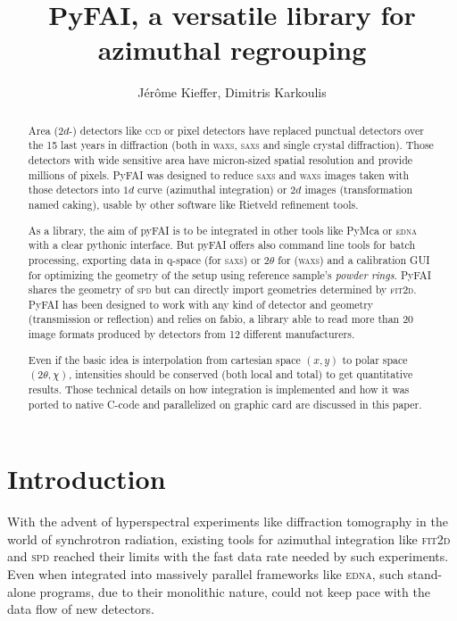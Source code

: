 \documentclass[a4paper]{jpconf}
\begin{document}
\title{PyFAI, a versatile library for azimuthal regrouping}

\author{J\'er\^ome Kieffer, Dimitris Karkoulis}

\address{European Synchrotron Radiation Facility; 6 rue Jules Horowitz;
38043 Grenoble; France}


\begin{abstract}
Area ($2d$-) detectors like \textsc{ccd} or pixel detectors have replaced
punctual detectors over the 15 last years in diffraction (both in \textsc{waxs},
\textsc{saxs} and single crystal diffraction). Those detectors with wide sensitive area have micron-sized spatial
resolution and provide millions of pixels. PyFAI was designed to reduce \textsc{saxs} and
\textsc{waxs} images taken with those detectors into $1d$ curve (azimuthal integration)
or $2d$ images (transformation named caking), usable by other software like
Rietveld refinement tools.

As a library, the aim of pyFAI is to be integrated in other tools like
PyMca\cite{pymca} or \textsc{edna}\cite{edna} with a clear pythonic interface. But pyFAI
offers also command line tools for batch processing, exporting data in q-space (for \textsc{saxs}) or 2$\theta$ for
(\textsc{waxs}) and a calibration GUI for optimizing the geometry of the setup
using reference sample's \textit{powder rings}.  PyFAI shares the geometry
of \textsc{spd}\cite{spd} but can directly import geometries determined by
\textsc{fit2d}\cite{fit2d1996}.
PyFAI has been designed to work with any kind of detector and geometry (transmission or reflection) and
relies on fabio\cite{fabio}, a library able to read more than 20 image formats
produced by detectors from 12 different manufacturers.

Even if the basic idea is interpolation from cartesian space $(x,y)$ to polar
space $(2\theta, \chi )$, intensities should be conserved (both local and total)
to get quantitative results.  Those technical details on how integration is implemented
and how it was ported to native C-code and parallelized on graphic card are
discussed  in this paper.
\end{abstract}

\section{Introduction}

With the advent of hyperspectral experiments like diffraction tomography in the
world of synchrotron radiation, existing tools for azimuthal integration like
\textsc{fit2d}\cite{fit2d1996} and \textsc{spd}\cite{spd} reached their limits with the fast data rate
needed by such experiments. Even when integrated into massively parallel
frameworks like \textsc{edna}\cite{edna}, such stand-alone programs, due to their
monolithic nature, could not keep pace with the data flow of new detectors.
\end{document}
